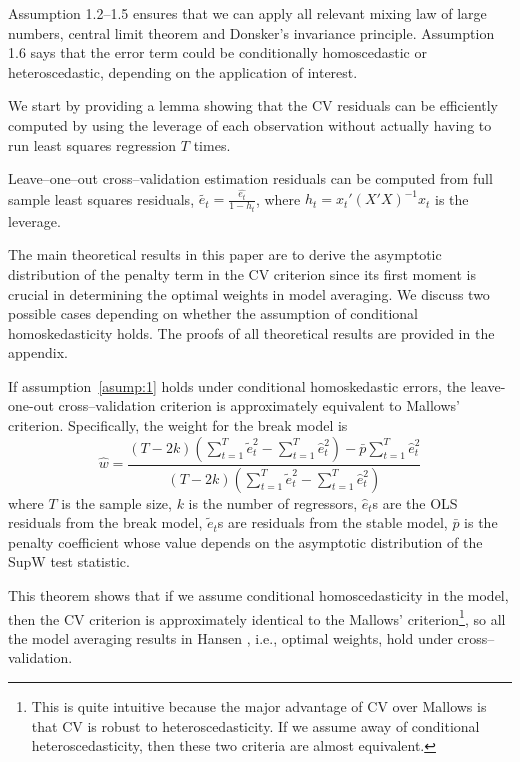 Assumption 1.2--1.5 ensures that we can apply all relevant mixing law of large numbers, central limit theorem and Donsker's invariance principle. Assumption 1.6 says that the error term could be conditionally homoscedastic or heteroscedastic, depending on the application of interest.

We start by providing a lemma showing that the CV residuals can be efficiently computed by using the leverage of each observation without actually having to run least squares regression $T$ times.
\begin{lemma} \label{lem:1}
Leave--one--out cross--validation estimation residuals can be computed from full sample least squares residuals, $\tilde{e_t} = \frac{\hat{e_t}}{1-h_t}$, where $h_t = x_t' (X'X)^{-1} x_t$ is the leverage.
\end{lemma}

The main theoretical results in this paper are to derive the asymptotic distribution of the penalty term in the CV criterion since its first moment is crucial in determining the optimal weights in model averaging. We discuss two possible cases depending on whether the assumption of conditional homoskedasticity holds. The proofs of all theoretical results are provided in the appendix.
\begin{theorem} \label{thm:1}
If assumption~\ref{asump:1} holds under conditional homoskedastic errors, the leave-one-out cross--validation criterion is approximately equivalent to Mallows' criterion. Specifically, the weight for the break model is
\begin{equation}
\hat{w} = \frac{(T - 2k)(\sum_{t=1}^{T}\tilde{e}_{t}^{2} - \sum_{t=1}^{T}\hat{e}_{t}^{2}) - \bar{p}\sum_{t=1}^{T}\hat{e}_{t}^{2}}{(T - 2k)(\sum_{t=1}^{T}\tilde{e}_{t}^{2} - \sum_{t=1}^{T}\hat{e}_{t}^{2})}
\end{equation}
where $T$ is the sample size, $k$ is the number of regressors, $\hat{e}_t$s are the OLS residuals from the break model, $\tilde{e}_t$s are residuals from the stable model, $\bar{p}$ is the penalty coefficient whose value depends on the asymptotic distribution of the SupW test statistic.
\end{theorem}
This theorem shows that if we assume conditional homoscedasticity in the model, then the CV criterion is approximately identical to the Mallows' criterion\footnote{This is quite intuitive because the major advantage of CV over Mallows is that CV is robust to heteroscedasticity. If we assume away of conditional heteroscedasticity, then these two criteria are almost equivalent.}, so all the model averaging results in Hansen \cite{hansen2009averaging}, i.e., optimal weights, hold under cross--validation.

